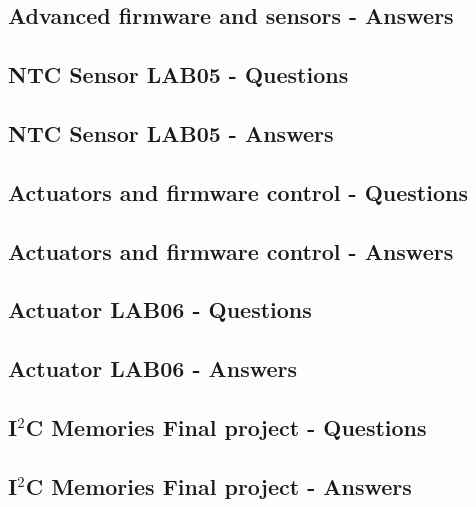 \documentclass[../main.tex]{subfiles}
\begin{document}
\subsection{Advanced firmware and sensors - Answers}

\vspace*{1.5cm}
\subsection{NTC Sensor LAB05 - Questions}
\subsection{NTC Sensor LAB05 - Answers}

\vspace*{1.5cm}
\subsection{Actuators and firmware control - Questions}
\subsection{Actuators and firmware control - Answers}

\vspace*{1.5cm}
\subsection{Actuator LAB06 - Questions}
\subsection{Actuator LAB06 - Answers}

\vspace*{1.5cm}
\subsection{I$^2$C Memories Final project - Questions}
\subsection{I$^2$C Memories Final project - Answers}
\end{document}
